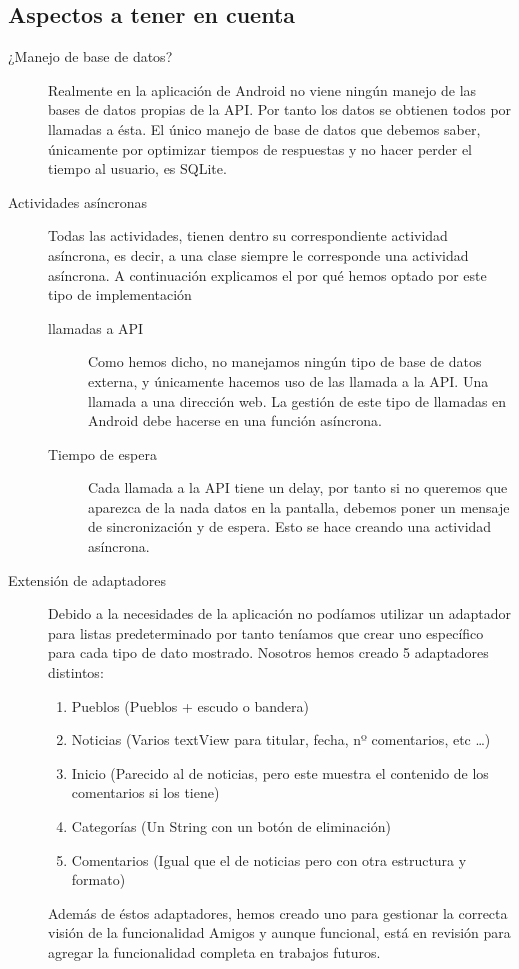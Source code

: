 \subsection{Aspectos a tener en cuenta}
	\begin{description}
	\item[¿Manejo de base de datos?]
		Realmente en la aplicación de Android no viene ningún manejo de las bases de datos propias de la API. Por tanto los datos se obtienen todos por llamadas a ésta. El único manejo de base de datos que debemos saber, únicamente por optimizar tiempos de respuestas y no hacer perder el tiempo al usuario, es SQLite.
	\item[Actividades asíncronas]
		Todas las actividades, tienen dentro su correspondiente actividad asíncrona, es decir, a una clase siempre le corresponde una actividad asíncrona. A continuación explicamos el por qué hemos optado por este tipo de implementación
		\begin{description}
			\item[llamadas a API]
			Como hemos dicho, no manejamos ningún tipo de base de datos externa, y únicamente hacemos uso de las llamada a la API. Una llamada a una dirección web. La gestión de este tipo de llamadas en Android debe hacerse en una función asíncrona. 
			\item[Tiempo de espera]
				Cada llamada a la API tiene un delay, por tanto si no queremos que aparezca de la nada datos en la pantalla, debemos poner un mensaje de sincronización y de espera. Esto se hace creando una actividad asíncrona.
		\end{description}
	\item[Extensión de adaptadores]
		Debido a la necesidades de la aplicación no podíamos utilizar un adaptador para listas predeterminado por tanto teníamos que crear uno específico para cada tipo de dato mostrado. Nosotros hemos creado 5 adaptadores distintos:
		\begin{enumerate}
			\item Pueblos (Pueblos + escudo o bandera)
			\item Noticias (Varios textView para titular, fecha, nº comentarios, etc \ldots)
			\item Inicio (Parecido al de noticias, pero este muestra el contenido de los comentarios si los tiene)
			\item Categorías (Un String con un botón de eliminación)
			\item Comentarios (Igual que el de noticias pero con otra estructura y formato)
		\end{enumerate}

Además de éstos adaptadores, hemos creado uno para gestionar la correcta visión de la funcionalidad Amigos y aunque funcional, está en revisión para agregar la funcionalidad completa en trabajos futuros.
	\end{description}


